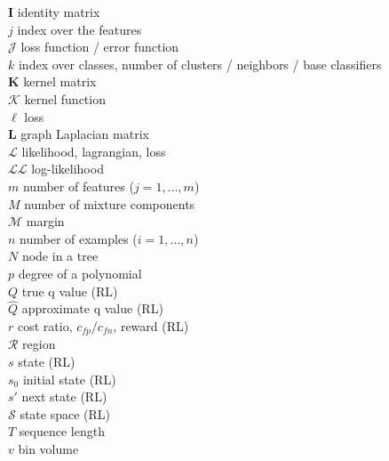 \documentclass[12pt]{article}
\begin{document}
\begin{tabbing}
	\> $\bm{I}$									\>	identity matrix										\\[3mm]
	\> $j$										\>	index over the features								\\[3mm]
	\> $\mathcal{J}$								\>	loss function / error function								\\[3mm]
	\> $k$										\>	index over classes, number of clusters / neighbors / base classifiers	\\[3mm]
	\> $\bm{K}$									\>	kernel matrix										\\[3mm]
	\> $\mathcal{K}$								\>	kernel function										\\[3mm]
	\> $\ell$										\>	loss												\\[3mm]
	\> $\bm{L}$									\>	graph Laplacian matrix									\\[3mm]
	\> $\mathcal{L}$								\>	likelihood, lagrangian, loss								\\[3mm]
	\> $\mathcal{LL}$								\>	log-likelihood										\\[3mm]
	\> $m$										\>	number of features ($j = 1, \dots, m$)						\\[3mm]
	\> $M$										\>	number of mixture components							\\[3mm]
	\> $\mathcal{M}$								\>	margin											\\[3mm]
	\> $n$										\>	number of examples ($i = 1, \dots, n$)						\\[3mm]
	\> $N$										\>	node in a tree										\\[3mm]
	\> $p$										\>	degree of a polynomial									\\[3mm]
	\> $Q$										\>	true q value (RL)										\\[3mm]
	\> $\widehat{Q}$								\>	approximate q value (RL)								\\[3mm]
	\> $r$										\>	cost ratio, $c_{fp} / c_{fn}$, reward (RL)					\\[3mm]
	\> $\mathcal{R}$								\>	region											\\[3mm]
	\> $s$										\>	state (RL)											\\[3mm]
	\> $s_0$										\>	initial state (RL)										\\[3mm]
	\> $s'$										\>	next state (RL)										\\[3mm]
	\> $\mathcal{S}$								\>	state space (RL)										\\[3mm]
	\> $T$										\>	sequence length										\\[3mm]
	\> $v$										\>	bin volume											\\[3mm]

\end{tabbing}
\end{document}
